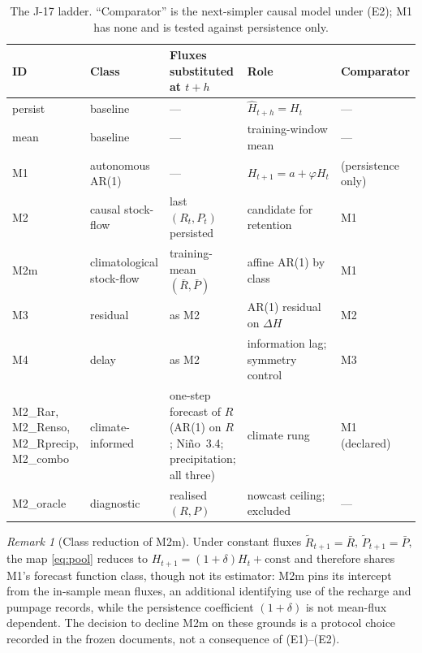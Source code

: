 \documentclass[preprint,11pt,authoryear]{elsarticle}
\theoremstyle{definition}
\theoremstyle{remark}
\newtheorem{remark}{Remark}
\begin{document}
\begin{table}[!htb]
\centering\small
\caption{The J-17 ladder. ``Comparator'' is the next-simpler causal model under (E2); M1 has none and is tested against persistence only.}
\label{tab:edwladder}
\begin{tabularx}{\textwidth}{@{}>{\raggedright\arraybackslash}p{}>{\raggedright\arraybackslash}p{}>{\raggedright\arraybackslash}p{}L>{\raggedright\arraybackslash}p{0.14\textwidth}@{}}
\toprule
ID & Class & Fluxes substituted at $t+h$ & Role & Comparator \\
\midrule
persist & baseline & --- & $\hat H_{t+h}=H_t$ & --- \\
mean & baseline & --- & training-window mean & --- \\
M1 & autonomous AR(1) & --- & $H_{t+1}=a+\varphi H_t$ & (persistence only) \\
M2 & causal stock-flow & last $(R_t,P_t)$ persisted & candidate for retention & M1 \\
M2m & climatological stock-flow & training-mean $(\bar R,\bar P)$ & affine AR(1) by class & M1 \\
M3 & residual & as M2 & AR(1) residual on $\Delta H$ & M2 \\
M4 & delay & as M2 & information lag; symmetry control & M3 \\
M2\_Rar, M2\_Renso, M2\_Rprecip, M2\_combo & climate-informed & one-step forecast of $R$ (AR(1) on $R$; Ni\~no~3.4; precipitation; all three) & climate rung & M1 (declared) \\
M2\_oracle & diagnostic & realised $(R,P)$ & nowcast ceiling; excluded & --- \\
\bottomrule
\end{tabularx}
\end{table}

\begin{remark}[Class reduction of M2m]\label{rem:class}
Under constant fluxes $\tilde R_{t+1}=\bar R$, $\tilde P_{t+1}=\bar P$, the map \eqref{eq:pool} reduces to $H_{t+1}=(1+\delta)H_t+\mathrm{const}$ and therefore shares M1's forecast function class, though not its estimator: M2m pins its intercept from the in-sample mean fluxes, an additional identifying use of the recharge and pumpage records, while the persistence coefficient $(1+\delta)$ is not mean-flux dependent. The decision to decline M2m on these grounds is a protocol choice recorded in the frozen documents, not a consequence of (E1)--(E2).
\end{remark}
\end{document}
